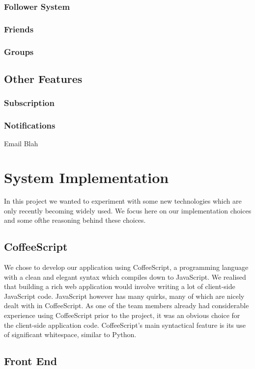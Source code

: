 \documentclass[11pt]{article}
\begin{document}
\subsubsection {Follower System}
\subsubsection {Friends}
\subsubsection {Groups}
\subsection {Other Features}
\subsubsection {Subscription}
\subsubsection {Notifications}

Email Blah

\section {System Implementation}

In this project we wanted to experiment with some new technologies which are only recently becoming widely used. We focus here on our implementation choices and some ofthe reasoning behind these choices.

\subsection{CoffeeScript}
We chose to develop our application using CoffeeScript, a programming language with a clean and elegant syntax which compiles down to JavaScript. We realised that building a rich web application would involve writing a lot of client-side JavaScript code. JavaScript however has many quirks, many of which are nicely dealt with in CoffeeScript. As one of the team members already had considerable experience using CoffeeScript prior to the project, it was an obvious choice for the client-side application code. CoffeeScript's main syntactical feature is its use of significant whitespace, similar to Python.

\subsection {Front End}
\end{document}
